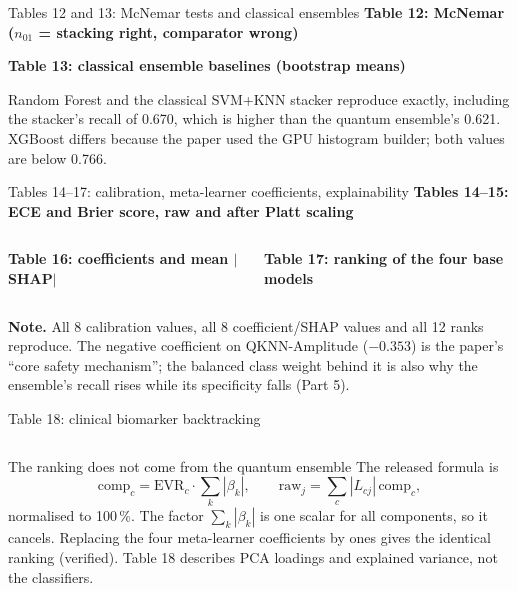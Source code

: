 \documentclass[aspectratio=169,10pt,t,xcolor={table}]{beamer}
\newcommand{\tabdir}{../reimplementation/tex/slides/}
\begin{document}
\begin{frame}{Tables 12 and 13: McNemar tests and classical ensembles}
\textbf{Table 12: McNemar ($n_{01}$ = stacking right, comparator wrong)}\par\smallskip

\par\medskip
\textbf{Table 13: classical ensemble baselines (bootstrap means)}\par\smallskip

\par\smallskip\footnotesize Random Forest and the classical SVM+KNN stacker reproduce exactly, including the stacker's recall of 0.670, which is higher than the quantum ensemble's 0.621. XGBoost differs because the paper used the GPU histogram builder; both values are below 0.766.
\end{frame}

\begin{frame}{Tables 14--17: calibration, meta-learner coefficients, explainability}
\textbf{Tables 14--15: ECE and Brier score, raw and after Platt scaling}\par\smallskip

\par\medskip
\begin{columns}[T]
\textbf{Table 16: coefficients and mean $|$SHAP$|$}\par\smallskip

\textbf{Table 17: ranking of the four base models}\par\smallskip

\end{columns}
\par\medskip
{\scriptsize\textbf{Note.} All 8 calibration values, all 8 coefficient/SHAP values and all 12 ranks reproduce. The negative coefficient on QKNN-Amplitude ($-0.353$) is the paper's ``core safety mechanism''; the balanced class weight behind it is also why the ensemble's recall rises while its specificity falls (Part 5).\par}
\end{frame}

\begin{frame}{Table 18: clinical biomarker backtracking}
\begin{columns}[T]

\begin{alertblock}{The ranking does not come from the quantum ensemble}
\footnotesize The released formula is
\[
\text{comp}_c=\mathrm{EVR}_c\cdot\sum_k|\beta_k|,\qquad \text{raw}_j=\sum_c |L_{cj}|\,\text{comp}_c,
\]
normalised to 100\,\%. The factor $\sum_k|\beta_k|$ is one scalar for all components, so it cancels. Replacing the four meta-learner coefficients by ones gives the identical ranking (verified). Table 18 describes PCA loadings and explained variance, not the classifiers.
\end{alertblock}
\end{columns}
\end{frame}
\end{document}
